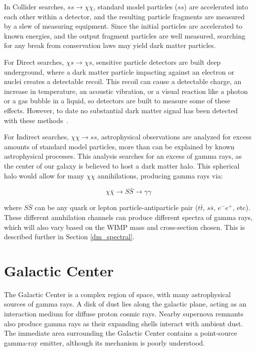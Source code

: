     In Collider searches, $ss \rightarrow \chi\chi$, standard model particles ($ss$) are accelerated into each other within a detector, and the resulting particle fragments are measured by a slew of measuring equipment.
    Since the initial particles are accelerated to known energies, and the output fragment particles are well measured, searching for any break from conservation laws may yield dark matter particles. 
    
    For Direct searches, $\chi s \rightarrow \chi s$, sensitive particle detectors are built deep underground, where a dark matter particle impacting against an electron or nuclei creates a detectable recoil.
    This recoil can cause a detectable charge, an increase in temperature, an acoustic vibration, or a visual reaction like a photon or a gas bubble in a liquid, so detectors are built to measure some of these effects.
    However, to date no substantial dark matter signal has been detected with these methods~\cite{direct_dm_detection}.
    
    For Indirect searches, $\chi\chi \rightarrow ss$, astrophysical observations are analyzed for excess amounts of standard model particles, more than can be explained by known astrophysical processes.
    This analysis searches for an excess of gamma rays, as the center of our galaxy is believed to host a dark matter halo.
    This spherical halo would allow for many $\chi\chi$ annihilations, producing gamma rays via: 
    
    $$\chi\bar{\chi} \rightarrow S\bar{S} \rightarrow \gamma\gamma$$

    where $S\bar{S}$ can be any quark or lepton particle-antiparticle pair ($t\bar{t}$, $s\bar{s}$, $e^{-}e^{+}$, etc).
    These different annhilation channels can produce different spectra of gamma rays, which will also vary based on the WIMP mass and cross-section chosen.
    This is described further in Section \ref{dm_spectral}.

\FloatBarrier

\section{Galactic Center}

  The Galactic Center is a complex region of space, with many astrophysical sources of gamma rays.
  A disk of dust lies along the galactic plane, acting as an interaction medium for diffuse proton cosmic rays.
  Nearby supernova remnants also produce gamma rays as their expanding shells interact with ambient dust.
  The immediate area surrounding the Galactic Center contains a point-source gamma-ray emitter, although its mechanism is poorly understood.

